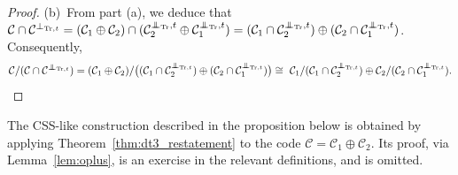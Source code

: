 \documentclass{article}
\DeclareMathOperator{\Tr}{Tr}
\newcommand\independent{\protect\mathpalette{\protect\independenT}{\perp}}
\def\independenT#1#2{\mathrel{\rlap{$#1#2$}\mkern3mu{#1#2}}}
\theoremstyle{remark}
\theoremstyle{definition}
\numberwithin{equation}{section}
\begin{document}
\begin{proof}
\medskip

(b)\ From part (a), we deduce that $\mathcal{C} \cap \mathcal{C}^{\perp_{{\Tr,t}}} = (\mathcal{C}_1 \oplus \mathcal{C}_2) \cap (\mathcal{C}_2^{\independent_{\Tr},t} \oplus \mathcal{C}_1^{\independent_{\Tr},t}) =(\mathcal{C}_1 \cap\mathcal{C}_2^{\independent_{\Tr},t}) \oplus (\mathcal{C}_2 \cap \mathcal{C}_1^{\independent_{\Tr},t})$. Consequently,
$$
 \mathcal{C}/(\mathcal{C} \cap \mathcal{C}^{\independent_{\Tr,t}})  =(\mathcal{C}_1 \oplus \mathcal{C}_2)  /\bigl((\mathcal{C}_1 \cap\mathcal{C}_2^{\independent_{\Tr,t}}) \oplus (\mathcal{C}_2 \cap \mathcal{C}_1^{\independent_{\Tr,t}})\bigr) \cong \ \mathcal{C}_1/ (\mathcal{C}_1 \cap\mathcal{C}_2^{\independent_{\Tr,t}})  \oplus \mathcal{C}_2/(\mathcal{C}_2 \cap \mathcal{C}_1^{\independent_{\Tr,t}}).
 $$
\end{proof}

The CSS-like construction described in the proposition below is obtained by applying Theorem~\ref{thm:dt3_restatement} to the code $\mathcal{C} = \mathcal{C}_1 \oplus \mathcal{C}_2$. Its proof, via Lemma~\ref{lem:oplus}, is an exercise in the relevant definitions, and is omitted.
\end{document}
